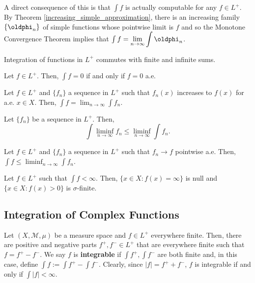\documentclass[11pt]{article}
\newcommand{\M}{\mathcal{M}}
\renewcommand{\phi}{\oldphi}
\newcommand{\llim}{\displaystyle\lim}
\newcommand{\lliminf}{\displaystyle\liminf}
\begin{document}
A direct consequence of this is that $\int f$ is actually computable for any $f\in L^+$. By Theorem \ref{increasing_simple_approximation}, there is an increasing family $\{\phi_n\}$ of simple functions whose pointwise limit is $f$ and so the Monotone Convergence Theorem implies that $\int f=\llim_{n\to\infty}\int\phi_n$.

\begin{proposition}
Integration of functions in $L^+$ commutes with finite and infinite sums.
\end{proposition}

\begin{proposition}
Let $f\in L^+$. Then, $\int f=0$ if and only if $f=0$ a.e.
\end{proposition}

\begin{corollary}
Let $f\in L^+$ and $\{f_n\}$ a sequence in $L^+$ such that $f_n(x)$ increases to $f(x)$ for a.e. $x\in X$. Then, $\int f=\llim_{n\to\infty}\int f_n$.
\end{corollary}

\begin{theorem}
Let $\{f_n\}$ be a sequence in $L^+$. Then,
$$\int\lliminf_{n\to\infty}f_n\leq\lliminf_{n\to\infty}\int f_n.$$
\end{theorem}

\begin{corollary}
Let $f\in L^+$ and $\{f_n\}$ a sequence in $L^+$ such that $f_n\to f$ pointwise a.e. Then, $\int f\leq\lliminf_{n\to\infty}\int f_n$.
\end{corollary}

\begin{proposition}
Let $f\in L^+$ such that $\int f<\infty$. Then, $\{x\in X : f(x)=\infty\}$ is null and $\{x\in X : f(x)>0\}$ is $\sigma$-finite.
\end{proposition}

\subsection{Integration of Complex Functions}
Let $(X,\M,\mu)$ be a measure space and $f\in L^+$ everywhere finite. Then, there are positive and negative parts $f^+,f^-\in L^+$ that are everywhere finite such that $f=f^+-f^-$. We say $f$ is \textbf{integrable} if $\int f^+,\int f^-$ are both finite and, in this case, define $\int f:=\int f^+-\int f^-$. Clearly, since $|f|=f^++f^-$, $f$ is integrable if and only if $\int|f|<\infty$.
\end{document}
